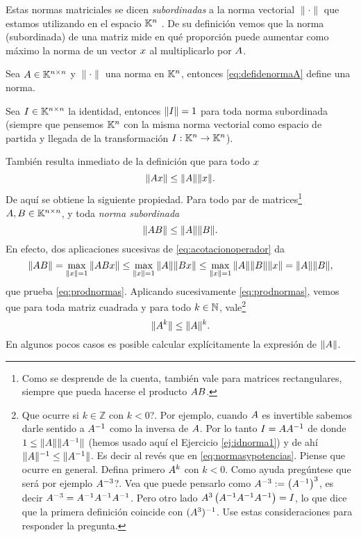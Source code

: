 Estas normas matriciales se dicen \emph{subordinadas} a la norma vectorial $\|\cdot\|$ que estamos utilizando
en el espacio $\mathbb K^{n}$ . De su definición vemos que  la norma (subordinada) de una matriz mide en qué proporción puede aumentar como máximo la norma de un vector $\xb$ al multiplicarlo por $\Ab$.

\begin{ejercicio}
Sea $\Ab\in \Knn$ y $\|\cdot\|$ una norma en $\mathbb K^{n}$, entonces
 \eqref{eq:defidenormaA} define una norma.
\end{ejercicio}
\begin{ejercicio}
\label{ej:idnorma1}
Sea $\Ib\in \Knn$ la identidad, entonces
 $\|\Ib\|=1$ para toda norma subordinada (siempre que pensemos $\mathbb K^{n}$ con la misma norma vectorial como espacio de partida y llegada de la transformación $\Ib:\Kn\to \Kn$).
\end{ejercicio}

También resulta inmediato de la definición que para todo $\xb$
\begin{equation}
 \label{eq:acotacionoperador}
\|\Ab\xb\|\le \|\Ab\|\|\xb\|.
\end{equation}
De aquí se obtiene la siguiente propiedad. Para todo par de matrices\footnote{Como se desprende de la cuenta,  también vale para matrices rectangulares, siempre que pueda hacerse el producto $\Ab\Bb$.} $\Ab, \Bb\in \Knn$, y toda \emph{norma subordinada}
\begin{equation}
 \label{eq:prodnormas}
\|\Ab\Bb\|\le \|\Ab\|\|\Bb\|.
\end{equation}
En efecto,
dos aplicaciones sucesivas de \eqref{eq:acotacionoperador} da
$$
 \|\Ab\Bb\|=\max_{\|\xb\|=1}
\|\Ab\Bb\xb\|\le \max_{\|\xb\|=1}
\|\Ab\|\|\Bb\xb\|\le \max_{\|\xb\|=1}\|\Ab\|\|\Bb\|\|\xb\|=\|\Ab\|\|\Bb\|,$$
que prueba \eqref{eq:prodnormas}.
Aplicando sucesivamente \eqref{eq:prodnormas}, vemos que para toda matriz cuadrada y para todo $k\in\mathbb N$, vale\footnote{Que ocurre si $k\in \mathbb{Z}$ con $k<0$?. Por ejemplo, cuando $\Ab$ es invertible sabemos darle sentido a $\Ab^{-1}$ como la inversa de $\Ab$.
Por lo tanto $\Ib=\Ab\Ab^{-1}$ de donde $1\le \|\Ab\|\|\Ab^{-1}\|$  (hemos usado aquí el Ejercicio \ref{ej:idnorma1}) y de ahí $\|\Ab\|^{-1}\le \|\Ab^{-1}\|$. Es decir al revés que en  \eqref{eq:normasypotencias}.  Piense que ocurre en general. Defina primero $\Ab^{k}$ con $k<0$. Como ayuda pregúntese que será por ejemplo $\Ab^{-3}$?. Vea que puede pensarlo como $\Ab^{-3}:=\left(\Ab^{-1}\right)^3$, es decir $\Ab^{-3}=\Ab^{-1}\Ab^{-1}\Ab^{-1}$. Pero otro lado $\Ab^3\left(\Ab^{-1}\Ab^{-1}\Ab^{-1}\right)=\Ib$, lo que dice que la primera definición coincide con $(\Ab^3)^{-1}$. Use estas consideraciones para responder la pregunta.}
\begin{equation}
 \label{eq:normasypotencias}
\|\Ab^k\|\le \|\Ab\|^k.
 \end{equation}
En algunos pocos casos es posible calcular explícitamente la expresión de $\|\Ab\|$.


